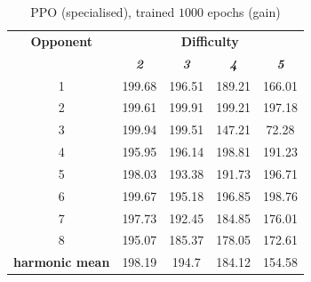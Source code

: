 \documentclass[conference]{IEEEtran}
\begin{document}
    \begin{table}[htbp]
      \caption{PPO (specialised), trained $1000$ epochs (gain)}
              \begin{center}
            \begin{tabular}{|c|c|c|c|c|}
                \hline
                \textbf{Opponent} & \multicolumn{4}{|c|}{\textbf{Difficulty}} \\
                \cline{2-5}
                & \textbf{\textit{2}} & \textbf{\textit{3}} & \textbf{\textit{4}} & \textbf{\textit{5}} \\
                \hline
                1                      & 199.68              & 196.51              & 189.21              & 166.01              \\
                2                      & 199.61              & 199.91              & 199.21              & 197.18              \\
                3                      & 199.94              & 199.51              & 147.21              & 72.28               \\
                4                      & 195.95              & 196.14              & 198.81              & 191.23              \\
                5                      & 198.03              & 193.38              & 191.73              & 196.71              \\
                6                      & 199.67              & 195.18              & 196.85              & 198.76              \\
                7                      & 197.73              & 192.45              & 184.85              & 176.01              \\
                8                      & 195.07              & 185.37              & 178.05              & 172.61              \\
                \hline
                \textbf{harmonic mean} & 198.19              & 194.7               & 184.12              & 154.58              \\
                \hline
            \end{tabular}
            \label{Specialized PPO against multiple difficulties (gain)}
        \end{center}
        \end{table}
    
\end{document}
